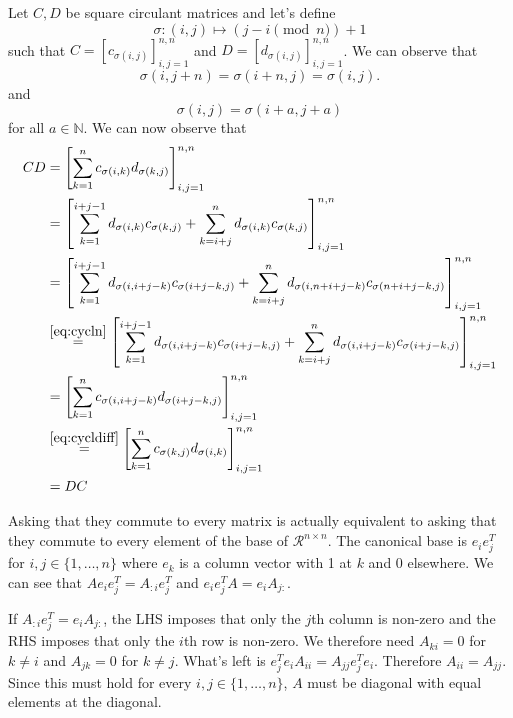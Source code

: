 \begin{solution}
  Let $C,D$ be square circulant matrices and let's define
  \[ \sigma : (i,j) \mapsto (j - i \pmod{n})+1 \]
  such that
  $C = [c_{\sigma(i,j)}]_{i,j=1}^{n,n}$ and
  $D = [d_{\sigma(i,j)}]_{i,j=1}^{n,n}$.
  We can observe that
  \begin{equation}
    \label{eq:cycln}
    \sigma(i,j+n) = \sigma(i+n,j) = \sigma(i,j).
  \end{equation}
  and
  \begin{equation}
    \label{eq:cycldiff}
    \sigma(i,j) = \sigma(i+a,j+a)
  \end{equation}
  for all $a \in \mathbb{N}$.
  We can now observe that
  \begin{align*}
    CD
    & =
    \left[
      \sum_{k=1}^n
      c_{\sigma(i,k)}d_{\sigma(k,j)}
    \right]_{i,j=1}^{n,n}\\
    & =
    \left[
      \sum_{k=1}^{i+j-1}
      d_{\sigma(i,k)}c_{\sigma(k,j)}
      +
      \sum_{k=i+j}^{n}
      d_{\sigma(i,k)}c_{\sigma(k,j)}
    \right]_{i,j=1}^{n,n}\\
    & =
    \left[
      \sum_{k=1}^{i+j-1}
      d_{\sigma(i,i+j-k)}c_{\sigma(i+j-k,j)}
      +
      \sum_{k=i+j}^{n}
      d_{\sigma(i,n+i+j-k)}c_{\sigma(n+i+j-k,j)}
    \right]_{i,j=1}^{n,n}\\
    & \stackrel{\eqref{eq:cycln}}{=}
    \left[
      \sum_{k=1}^{i+j-1}
      d_{\sigma(i,i+j-k)}c_{\sigma(i+j-k,j)}
      +
      \sum_{k=i+j}^{n}
      d_{\sigma(i,i+j-k)}c_{\sigma(i+j-k,j)}
    \right]_{i,j=1}^{n,n}\\
    & =
    \left[
      \sum_{k=1}^n
      c_{\sigma(i,i+j-k)}d_{\sigma(i+j-k,j)}
    \right]_{i,j=1}^{n,n}\\
    & \stackrel{\eqref{eq:cycldiff}}{=}
    \left[
      \sum_{k=1}^n
      c_{\sigma(k,j)}d_{\sigma(i,k)}
    \right]_{i,j=1}^{n,n}\\
    & = DC
  \end{align*}
\end{solution}

\begin{solution}
  Asking that they commute to every matrix is actually equivalent to asking
  that they commute to every element of the base of $\mathcal{R}^{n \times n}$.
  The canonical base is $e_ie_j^T$ for $i,j \in \{1, \ldots, n\}$ where
  $e_k$ is a column vector with 1 at $k$ and 0 elsewhere.
  We can see that $Ae_ie_j^T = A_{:i}e_j^T$ and $e_ie_j^TA = e_iA_{j:}$.

  If $A_{:i}e_j^T = e_iA_{j:}$, the LHS imposes that only the $j$th column is non-zero
  and the RHS imposes that only the $i$th row is non-zero.
  We therefore need $A_{ki} = 0$ for $k \neq i$ and $A_{jk} = 0$ for $k \neq j$.
  What's left is $e_j^Te_iA_{ii} = A_{jj}e_j^Te_i$.
  Therefore $A_{ii} = A_{jj}$.
  Since this must hold for every $i,j \in \{1, \ldots, n\}$, $A$ must be diagonal
  with equal elements at the diagonal.
\end{solution}

